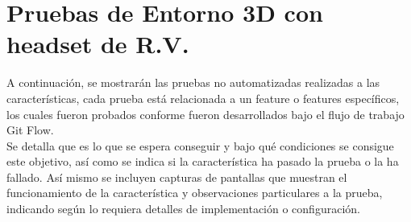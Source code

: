 \section{Pruebas de Entorno 3D con headset de R.V.}
A continuación, se mostrarán las pruebas no automatizadas realizadas a las características, cada prueba está relacionada a un feature o features específicos, los cuales fueron probados conforme fueron desarrollados bajo el flujo de trabajo Git Flow\cite{pathania2017elements}.\\ 

Se detalla que es lo que se espera conseguir y bajo qué condiciones se consigue este objetivo, así como se indica si la característica ha pasado la prueba o la ha fallado. Así mismo se incluyen capturas de pantallas que muestran el funcionamiento de la característica y observaciones particulares a la prueba, indicando según lo requiera detalles de implementación o configuración.\\

